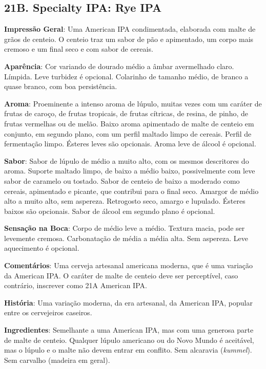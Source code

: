 \subsection*{21B. Specialty IPA: Rye IPA}

\textbf{Impressão Geral}: Uma American IPA condimentada, elaborada com malte de grãos de centeio. O centeio traz um sabor de pão e apimentado, um corpo mais cremoso e um final seco e com sabor de cereais.

\textbf{Aparência}: Cor variando de dourado médio a âmbar avermelhado claro. Límpida. Leve turbidez é opcional. Colarinho de tamanho médio, de branco a quase branco, com boa persistência.

\textbf{Aroma}: Proeminente a intenso aroma de lúpulo, muitas vezes com um caráter de frutas de caroço, de frutas tropicais, de frutas cítricas, de resina, de pinho, de frutas vermelhas ou de melão. Baixo aroma apimentado de malte de centeio em conjunto, em segundo plano, com um perfil maltado limpo de cereais. Perfil de fermentação limpo. Ésteres leves são opcionais. Aroma leve de álcool é opcional.

\textbf{Sabor}: Sabor de lúpulo de médio a muito alto, com os mesmos descritores do aroma. Suporte maltado limpo, de baixo a médio baixo, possivelmente com leve sabor de caramelo ou tostado. Sabor de centeio de baixo a moderado como cereais, apimentado e picante, que contribui para o final seco. Amargor de médio alto a muito alto, sem aspereza. Retrogosto seco, amargo e lupulado. Ésteres baixos são opcionais. Sabor de álcool em segundo plano é opcional.

\textbf{Sensação na Boca}: Corpo de médio leve a médio. Textura macia, pode ser levemente cremosa. Carbonatação de média a média alta. Sem aspereza. Leve aquecimento é opcional.

\textbf{Comentários}: Uma cerveja artesanal americana moderna, que é uma variação da American IPA. O caráter de malte de centeio deve ser perceptível, caso contrário, inscrever como 21A American IPA.

\textbf{História}: Uma variação moderna, da era artesanal, da American IPA, popular entre os cervejeiros caseiros.

\textbf{Ingredientes}: Semelhante a uma American IPA, mas com uma generosa parte de malte de centeio. Qualquer lúpulo americano ou do Novo Mundo é aceitável, mas o lúpulo e o malte não devem entrar em conflito. Sem alcaravia (\textit{kummel}). Sem carvalho (madeira em geral).


